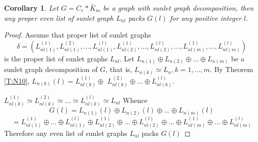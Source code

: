 \documentclass[12pt]{report}
\newtheorem{cor}[thm]{Corollary}
\begin{document}
\begin{cor}\label{C:N3}
Let $G=C_{r}*\bar{K}_{m}$ be a graph with sunlet graph
decomposition, then any proper even list of sunlet graph $L_{nl}$
packs $G\left( l\right) $ for any positive integer $l$.
\end{cor}
\begin{proof}
Assume that proper list of sunlet graphs $$\delta =\left(
L_{nl(1)}^{(1)},L_{nl(1)}^{(2)},...,L_{nl(1)}^{(l)},L_{nl(2)}^{(1)},...,L_{nl(2)}^{(l)},...,L_{nl(m)}^{(1)},...,L_{nl(m)}^{(l)}\right)
$$ is the proper list of sunlet graphs $L_{nl}$. Let $L_{n(1)}\oplus
L_{n(2)}\oplus ...\oplus L_{n(m)}$ be a sunlet graph decomposition of $G$, that is, $L_{n(k)}\simeq L_{n},k=1,...,m$. By Theorem \ref{T:N10},
$L_{n(k)}\left( l\right)
=L_{nl(k)}^{(1)}\oplus $ $L_{nl(k)}^{(2)}\oplus ...\oplus L_{nl(k)}^{(l)}$.

$L_{nl(k)}^{(1)}\simeq L_{nl(k)}^{(2)}\simeq ...\simeq
L_{nl(k)}^{(l)}\simeq L_{nl}$ Whence
$$G\left( l\right) =L_{n(1)}\left( l\right) \oplus L_{n(2)}\left( l\right)
\oplus ...\oplus L_{n(m)}\left( l\right) $$
$$=L_{nl(1)}^{(1)}\oplus ...\oplus L_{nl(1)}^{(l)}\oplus
L_{nl(2)}^{(1)}\oplus ...\oplus L_{nl(2)}^{(l)}\oplus ...\oplus
L_{nl(m)}^{(1)}\oplus ...\oplus L_{nl(m)}^{(l)}$$
Therefore any even list of sunlet graphs $L_{nl}$ packs $G\left(
l\right) $
\end{proof}
\end{document}
